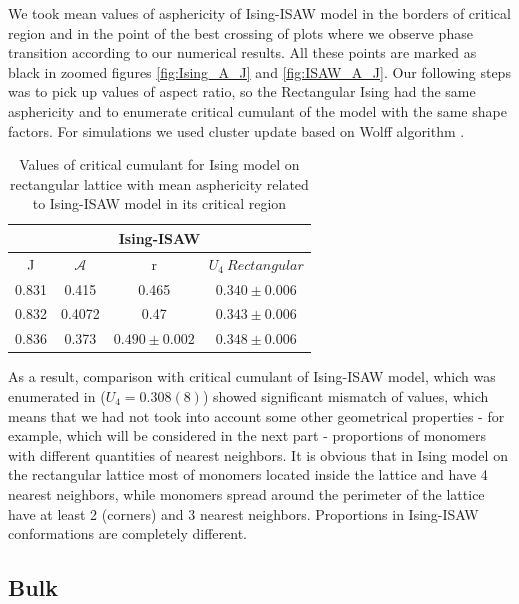 \documentclass[aps,pre,amssymb,amsmath,twocolumn,floatfix]{revtex4-2}
\begin{document}
We took mean values of asphericity of Ising-ISAW model in the borders of critical region and in the point of the best crossing of plots where we observe phase transition according to our numerical results. All these points are marked as black in zoomed figures \ref{fig:Ising_A_J} and \ref{fig:ISAW_A_J}. Our following steps was to pick up values of aspect ratio, so the Rectangular Ising had the same asphericity and to enumerate critical cumulant of the model with the same shape factors. For simulations we used cluster update based on Wolff algorithm \cite{newmanb99}.\\

\begin{table}[h]
    \centering
    \begin{tabular}{|c|c|c|c|}
        \hline
         \multicolumn{4}{|c|}{Ising-ISAW}  \\ \hline
         J & $\mathcal{A}$ & r & $U_{4}\  Rectangular$ \\ \hline
         0.831 & 0.415 & 0.465 & $0.340 \pm 0.006$\\ \hline
         0.832 & 0.4072 & 0.47 & $0.343 \pm 0.006$\\ \hline
         0.836 & 0.373 & $0.490 \pm 0.002$ & $0.348 \pm 0.006$\\ \hline
         \end{tabular}
    \caption{Values of critical cumulant for Ising model on rectangular lattice with mean asphericity related to Ising-ISAW model in its critical region}
    \label{tab:A_r_U}
\end{table}


As a result, comparison with critical cumulant of Ising-ISAW model, which was enumerated in \cite{faizullina2021critical} ($U_{4} = 0.308(8)$) showed significant mismatch of values, which means that we had not took into account some other geometrical properties - for example, which will be considered in the next part - proportions of monomers with different quantities of nearest neighbors. It is obvious that in Ising model on the rectangular lattice most of monomers located inside the lattice and have 4 nearest neighbors, while monomers spread around the perimeter of the lattice have at least 2 (corners) and 3 nearest neighbors. Proportions in Ising-ISAW conformations are completely different.

\subsection{Bulk}
\end{document}
